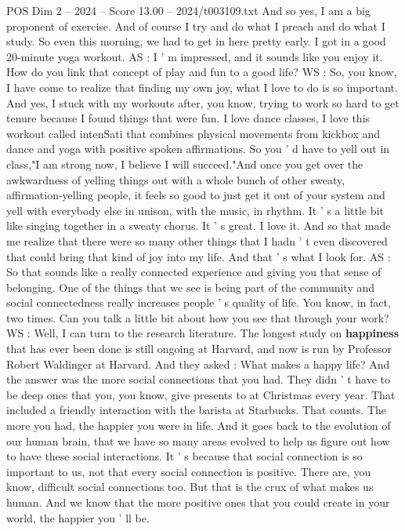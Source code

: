 \begin{textsample}{POS Dim 2 – 2024 – Score 13.00 – 2024/t003109.txt}
And so yes, I am a big proponent of exercise.
And of course I try and do what I preach and do what I study.
So even this morning, we had to get in here pretty early.
I got in a good 20-minute yoga workout.
AS : I ' m impressed, and it sounds like you enjoy it.
How do you link that concept of play and fun to a good life?
WS : So, you know, I have come to realize that finding my own joy, what I love to do is so important.
And yes, I stuck with my workouts after, you know, trying to work so hard to get tenure because I found things that were fun.
I love dance classes, I love this workout called intenSati that combines physical movements from kickbox and dance and yoga with positive spoken affirmations.
So you ' d have to yell out in class,"I am strong now, I believe I will succeed."And once you get over the awkwardness of yelling things out with a whole bunch of other sweaty, affirmation-yelling people, it feels so good to just get it out of your system and yell with everybody else in unison, with the music, in rhythm.
It ' s a little bit like singing together in a sweaty chorus.
It ' s great.
I love it.
And so that made me realize that there were so many other things that I hadn ' t even discovered that could bring that kind of joy into my life.
And that ' s what I look for.
AS : So that sounds like a really connected experience and giving you that sense of belonging.
One of the things that we see is being part of the community and social connectedness really increases people ' s quality of life.
You know, in fact, two times.
Can you talk a little bit about how you see that through your work?
WS : Well, I can turn to the research literature.
The longest study on \textbf{happiness} that has ever been done is still ongoing at Harvard, and now is run by Professor Robert Waldinger at Harvard.
And they asked : What makes a happy life?
And the answer was the more social connections that you had.
They didn ' t have to be deep ones that you, you know, give presents to at Christmas every year.
That included a friendly interaction with the barista at Starbucks.
That counts.
The more you had, the happier you were in life.
And it goes back to the evolution of our human brain, that we have so many areas evolved to help us figure out how to have these social interactions.
It ' s because that social connection is so important to us, not that every social connection is positive.
There are, you know, difficult social connections too.
But that is the crux of what makes us human.
And we know that the more positive ones that you could create in your world, the happier you ' ll be.

\end{textsample}
